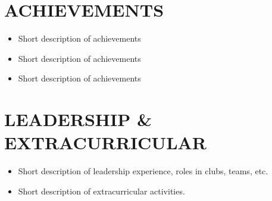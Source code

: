 \documentclass[letterpaper,11pt]{article}
\newcommand{\resumeItem}[1]{
  \item\small{
    {#1 \vspace{-2pt}}
  }
}
\newcommand{\resumeSubHeadingListStart}{\begin{itemize}[leftmargin=0.0in, label={}]}
\newcommand{\resumeSubHeadingListEnd}{\end{itemize}}
\begin{document}
\section{ACHIEVEMENTS}
  \resumeSubHeadingListStart
    \resumeItem{\normalsize{Short description of achievements}}
    \resumeItem{\normalsize{Short description of achievements}}
    \resumeItem{\normalsize{Short description of achievements}}
  \resumeSubHeadingListEnd

\section{LEADERSHIP \& EXTRACURRICULAR}
  \resumeSubHeadingListStart
    \resumeItem{\normalsize{Short description of leadership experience, roles in clubs, teams, etc.}}
    \resumeItem{\normalsize{Short description of extracurricular activities.}}
  \resumeSubHeadingListEnd
\end{document}

